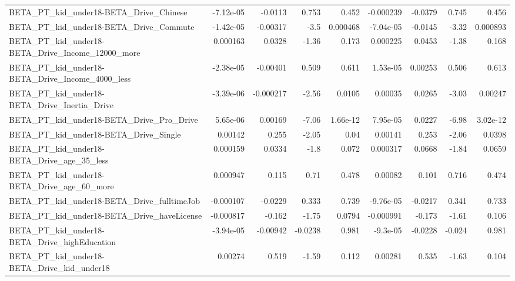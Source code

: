 \begin{tabular}{lrrrrrrrr}
BETA\_PT\_kid\_under18-BETA\_Drive\_Chinese             &   -7.12e-05 &      -0.0113 &    0.753 &    0.452 &  -0.000239 &     -0.0379 &        0.745 &         0.456 \\
BETA\_PT\_kid\_under18-BETA\_Drive\_Commute             &   -1.42e-05 &     -0.00317 &     -3.5 & 0.000468 &  -7.04e-05 &     -0.0145 &        -3.32 &      0.000893 \\
BETA\_PT\_kid\_under18-BETA\_Drive\_Income\_12000\_more   &    0.000163 &       0.0328 &    -1.36 &    0.173 &   0.000225 &      0.0453 &        -1.38 &         0.168 \\
BETA\_PT\_kid\_under18-BETA\_Drive\_Income\_4000\_less    &   -2.38e-05 &     -0.00401 &    0.509 &    0.611 &   1.53e-05 &     0.00253 &        0.506 &         0.613 \\
BETA\_PT\_kid\_under18-BETA\_Drive\_Inertia\_Drive       &   -3.39e-06 &    -0.000217 &    -2.56 &   0.0105 &    0.00035 &      0.0265 &        -3.03 &       0.00247 \\
BETA\_PT\_kid\_under18-BETA\_Drive\_Pro\_Drive           &    5.65e-06 &      0.00169 &    -7.06 & 1.66e-12 &   7.95e-05 &      0.0227 &        -6.98 &      3.02e-12 \\
BETA\_PT\_kid\_under18-BETA\_Drive\_Single              &     0.00142 &        0.255 &    -2.05 &     0.04 &    0.00141 &       0.253 &        -2.06 &        0.0398 \\
BETA\_PT\_kid\_under18-BETA\_Drive\_age\_35\_less         &    0.000159 &       0.0334 &     -1.8 &    0.072 &   0.000317 &      0.0668 &        -1.84 &        0.0659 \\
BETA\_PT\_kid\_under18-BETA\_Drive\_age\_60\_more         &    0.000947 &        0.115 &     0.71 &    0.478 &    0.00082 &       0.101 &        0.716 &         0.474 \\
BETA\_PT\_kid\_under18-BETA\_Drive\_fulltimeJob         &   -0.000107 &      -0.0229 &    0.333 &    0.739 &  -9.76e-05 &     -0.0217 &        0.341 &         0.733 \\
BETA\_PT\_kid\_under18-BETA\_Drive\_haveLicense         &   -0.000817 &       -0.162 &    -1.75 &   0.0794 &  -0.000991 &      -0.173 &        -1.61 &         0.106 \\
BETA\_PT\_kid\_under18-BETA\_Drive\_highEducation       &   -3.94e-05 &     -0.00942 &  -0.0238 &    0.981 &   -9.3e-05 &     -0.0228 &       -0.024 &         0.981 \\
BETA\_PT\_kid\_under18-BETA\_Drive\_kid\_under18         &     0.00274 &        0.519 &    -1.59 &    0.112 &    0.00281 &       0.535 &        -1.63 &         0.104 \\

\end{tabular}
